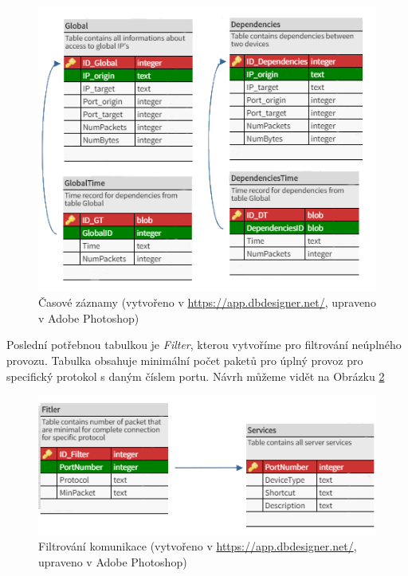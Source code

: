 \documentclass[thesis=B,czech,hidelinks]{FITthesis}[2019/03/21]
\begin{document}
        \begin{figure}[h]
            \centering
            \includegraphics[width=\textwidth]{TimeTables.png}
            \caption[Časové záznamy]{Časové záznamy (vytvořeno v \url{https://app.dbdesigner.net/}, upraveno v Adobe Photoshop) }
            \label{DBTime}
        \end{figure}
        
        \newpage
        
        Poslední potřebnou tabulkou je \emph{Filter}, kterou vytvoříme pro filtrování neúplného provozu. Tabulka obsahuje minimální počet paketů pro úplný provoz pro specifický protokol s daným číslem portu. Návrh můžeme vidět na Obrázku \ref{DBFilter}
        \begin{figure}[h]
            \centering
            \includegraphics[width=\textwidth]{Filter_Services.png}
            \caption[Filtrování komunikace]{Filtrování komunikace (vytvořeno v \url{https://app.dbdesigner.net/}, upraveno v Adobe Photoshop) }
            \label{DBFilter}
        \end{figure}
        
\end{document}
